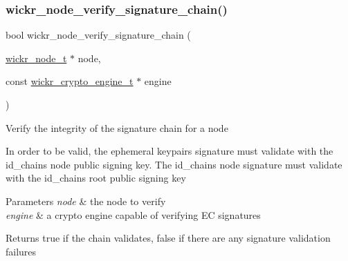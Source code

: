 \subsubsection{\texorpdfstring{wickr\_node\_verify\_signature\_chain()}{wickr\_node\_verify\_signature\_chain()}}
{\footnotesize\ttfamily bool wickr\+\_\+node\+\_\+verify\+\_\+signature\+\_\+chain (\begin{DoxyParamCaption}\item[{\mbox{\hyperlink{structwickr__node}{wickr\+\_\+node\+\_\+t}} $\ast$}]{node,  }\item[{const \mbox{\hyperlink{structwickr__crypto__engine}{wickr\+\_\+crypto\+\_\+engine\+\_\+t}} $\ast$}]{engine }\end{DoxyParamCaption})}

Verify the integrity of the signature chain for a node

In order to be valid, the ephemeral keypair\textquotesingle{}s signature must validate with the id\+\_\+chain\textquotesingle{}s \textquotesingle{}node\textquotesingle{} public signing key. The id\+\_\+chain\textquotesingle{}s \textquotesingle{}node\textquotesingle{} signature must validate with the id\+\_\+chain\textquotesingle{}s \textquotesingle{}root\textquotesingle{} public signing key


\begin{DoxyParams}{Parameters}
{\em node} & the node to verify \\
\hline
{\em engine} & a crypto engine capable of verifying EC signatures \\
\hline
\end{DoxyParams}
\begin{DoxyReturn}{Returns}
true if the chain validates, false if there are any signature validation failures 
\end{DoxyReturn}
